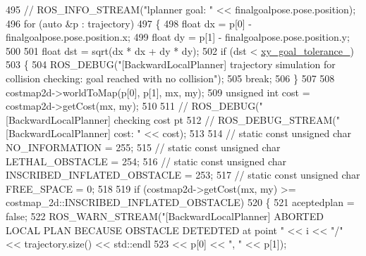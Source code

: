 \begin{DoxyCode}
{495                     \textcolor{comment}{// ROS\_INFO\_STREAM("lplanner goal: " << finalgoalpose.pose.position);}
496                     \textcolor{keywordflow}{for} (\textcolor{keyword}{auto} &p : trajectory)
497                     \{
498                         \textcolor{keywordtype}{float} dx = p[0] - finalgoalpose.pose.position.x;
499                         \textcolor{keywordtype}{float} dy = p[1] - finalgoalpose.pose.position.y;
500 
501                         \textcolor{keywordtype}{float} dst = sqrt(dx * dx + dy * dy);
502                         \textcolor{keywordflow}{if} (dst < \hyperlink{classcl__move__base__z_1_1backward__local__planner_1_1BackwardLocalPlanner_aa4ec2c87947a3c08f8278eff052e7c8c}{xy\_goal\_tolerance\_})
503                         \{
504                             ROS\_DEBUG(\textcolor{stringliteral}{"[BackwardLocalPlanner] trajectory simulation for collision checking:
       goal reached with no collision"});
505                             \textcolor{keywordflow}{break};
506                         \}
507 
508                         costmap2d->worldToMap(p[0], p[1], mx, my);
509                         \textcolor{keywordtype}{unsigned} \textcolor{keywordtype}{int} cost = costmap2d->getCost(mx, my);
510 
511                         \textcolor{comment}{// ROS\_DEBUG("[BackwardLocalPlanner] checking cost pt %
512                         \textcolor{comment}{// ROS\_DEBUG\_STREAM("[BackwardLocalPlanner] cost: " << cost);}
513 
514                         \textcolor{comment}{// static const unsigned char NO\_INFORMATION = 255;}
515                         \textcolor{comment}{// static const unsigned char LETHAL\_OBSTACLE = 254;}
516                         \textcolor{comment}{// static const unsigned char INSCRIBED\_INFLATED\_OBSTACLE = 253;}
517                         \textcolor{comment}{// static const unsigned char FREE\_SPACE = 0;}
518 
519                         \textcolor{keywordflow}{if} (costmap2d->getCost(mx, my) >= costmap\_2d::INSCRIBED\_INFLATED\_OBSTACLE)
520                         \{
521                             aceptedplan = \textcolor{keyword}{false};
522                             ROS\_WARN\_STREAM(\textcolor{stringliteral}{"[BackwardLocalPlanner] ABORTED LOCAL PLAN BECAUSE OBSTACLE
       DETEDTED at point "} << i << \textcolor{stringliteral}{"/"} << trajectory.size() << std::endl
523                                                                                                            
                       << p[0] << \textcolor{stringliteral}{", "} << p[1]);
}}
\end{DoxyCode}
